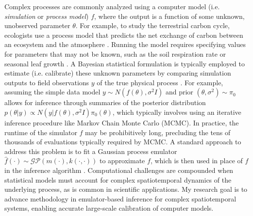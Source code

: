 \documentclass[11pt]{article}
\begin{document}
Complex processes are commonly analyzed using a computer model (i.e. \textit{simulation} or \textit{process model}) $f$, where the output is a function of some unknown, unobserved parameter $\theta$.
For example, to study the terrestrial carbon cycle, ecologists use a process model 
that predicts the net exchange of carbon between an ecosystem and the atmosphere \cite{Fer}. Running the model requires specifying values for parameters that 
may not be known, such as the soil respiration rate or seasonal leaf growth \cite{Fer}. A Bayesian statistical formulation is typically employed to estimate (i.e. calibrate) these unknown parameters by comparing simulation outputs to field observations $y$ of the true physical process \cite{Kennedy}. For example, assuming the simple data model $y \sim N(f(\theta), \sigma^2 I)$ and prior $(\theta, \sigma^2) \sim \pi_0$ allows for inference through summaries of the posterior distribution $p(\theta|y) \propto N(y|f(\theta), \sigma^2 I)\pi_0(\theta)$, which typically involves using an iterative inference procedure like Markov Chain Monte Carlo (MCMC). In practice, the runtime of the simulator $f$ may be prohibitively long, precluding the tens of thousands of evaluations typically required by MCMC. A standard approach to address this problem is to fit a Gaussian process 
emulator $\hat{f}(\cdot) \sim \mathcal{GP}(m(\cdot), k(\cdot, \cdot))$ to approximate $f$, which is then used in place of $f$ in the inference algorithm \cite{Fer, Kennedy, Cleary}. Computational challenges are compounded when statistical models must account for complex spatiotemporal dynamics of the underlying process, as is common in scientific applications. My research goal is to advance methodology in emulator-based inference for complex spatiotemporal systems, enabling accurate large-scale calibration of computer models.
\end{document}

